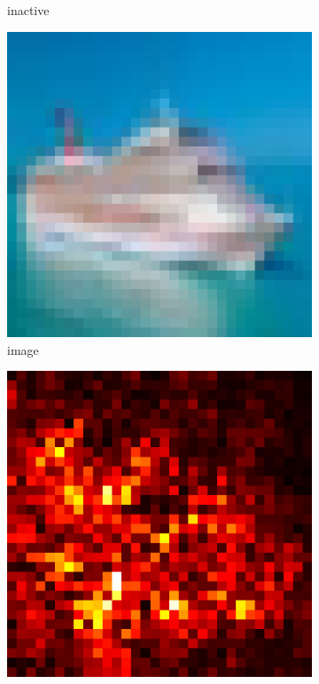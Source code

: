 \documentclass[preprint,12pt]{elsarticle}
\begin{document}
\begin{figure}
\begin{subfigure}{0.14\textwidth}
        \caption{inactive}
    \end{subfigure}
    \hfill
    \begin{subfigure}{0.14\linewidth}
        \centering
        \includegraphics[width=\linewidth]{../visualizations/examples/cifar10/resnet18/images/8.png}
        \caption{image}
    \end{subfigure}
    \hfill
    \begin{subfigure}{0.14\linewidth}
        \centering
        \includegraphics[width=\linewidth]{../visualizations/examples/cifar10/resnet18/saliency_map/8.png}

\end{subfigure}
\end{figure}
\end{document}
